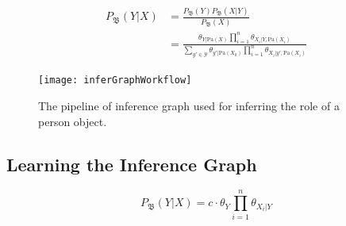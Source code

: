 \vspace{-1ex}
\begin{align}\label{eq:BNWithCls}
\begin{split}
P_\mathfrak{B}(Y|{X}) & = 
\frac{ P_\mathfrak{B}(Y) P_\mathfrak{B}({X}|Y) }{P_\mathfrak{B}({X})}\\
&=\frac{ \theta_{Y|\text{Pa}({X})} \prod_{i=1}^{n} \theta_{X_i|Y, \text{Pa}({X}_i)} }{ \sum_{y'\in \mathcal{Y}} \theta_{y'|\text{Pa}({X}_0)} \prod_{i=1}^{n} \theta_{X_i|y', \text{Pa}({X}_i)} }
\end{split}
\end{align}
\vspace{-1ex}

\begin{figure}[tb]
\centering
\texttt{[image: inferGraphWorkflow]}
\caption{The pipeline of inference graph used for inferring the role of a person object.}
\vspace{-4ex}
\label{fig:inferGraphWorkflow}
\end{figure}


\subsection{Learning the Inference Graph}
\vspace{-1ex}
\begin{equation}\label{eq:BN-naiveBayes}
P_\mathfrak{B}(Y| {X}) = c \cdot \theta_Y \prod_{i=1}^{n}\theta_{X_i|Y}
\end{equation}
\vspace{-1ex}


